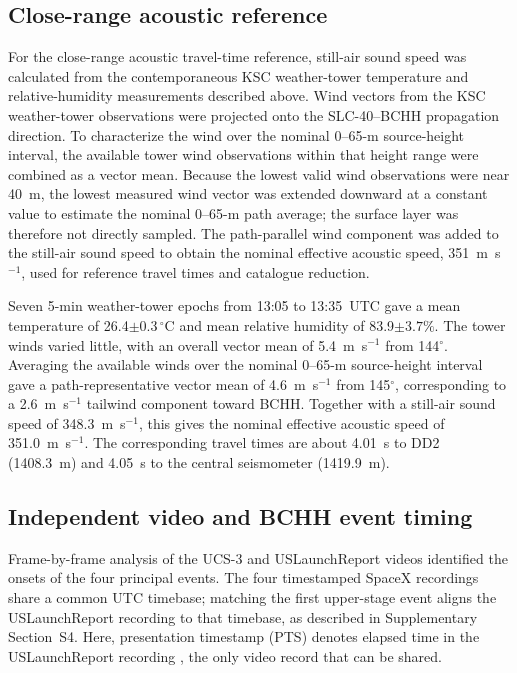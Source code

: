 \documentclass[]{seismica}
\begin{document}
\subsection{Close-range acoustic reference}

For the close-range acoustic travel-time reference, still-air sound speed was
calculated from the contemporaneous KSC weather-tower temperature and
relative-humidity measurements described above. Wind vectors from the KSC 
weather-tower observations were projected onto the SLC-40--BCHH propagation 
direction. To characterize the wind
over the nominal 0--65-m source-height interval, the available tower wind
observations within that height range were combined as a vector mean. Because
the lowest valid wind observations were near 40~m, the lowest measured wind
vector was extended downward at a constant value to estimate the nominal
0--65-m path average; the surface layer was therefore not directly sampled.
The path-parallel wind component was added to the still-air sound speed to
obtain the nominal effective acoustic speed, 351~m~s$^{-1}$, used for
reference travel times and catalogue reduction.

Seven 5-min weather-tower epochs from 13:05 to 13:35~UTC gave a mean
temperature of 26.4$\pm0.3\,^{\circ}$C and mean relative humidity of
83.9$\pm3.7\%$. The tower winds varied little, with an overall vector mean of
5.4~m~s$^{-1}$ from 144$^\circ$. Averaging the available winds over the
nominal 0--65-m source-height interval gave a path-representative vector mean
of 4.6~m~s$^{-1}$ from 145$^\circ$, corresponding to a 2.6~m~s$^{-1}$
tailwind component toward BCHH. Together with a still-air sound speed of
348.3~m~s$^{-1}$, this gives the nominal effective acoustic speed of
351.0~m~s$^{-1}$. The corresponding travel times are about 4.01~s to DD2
(1408.3~m) and 4.05~s to the central seismometer (1419.9~m).

\subsection{Independent video and BCHH event timing}

Frame-by-frame analysis of the UCS-3 and USLaunchReport videos identified
the onsets of the four principal events. The four timestamped SpaceX
recordings share a common UTC timebase; matching the first upper-stage
event aligns the USLaunchReport recording to that timebase, as described
in Supplementary Section~S4. Here, presentation timestamp (PTS) denotes
elapsed time in the USLaunchReport recording
\citep{uslaunchreport_amos6_video_2016}, the only video record that can be
shared.
\end{document}
